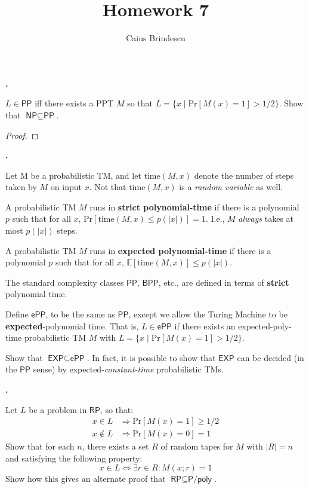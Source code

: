\documentclass[letterpaper,11pt]{article}
\title{Homework 7}
\author{Caius Brindescu}
\newcommand{\cc}[1]{\ensuremath{\textsf{#1}}\xspace}
\newcommand{\NP}{\cc{NP}}
\newcommand{\EXP}{\cc{EXP}}
\newcommand{\Ppoly}{\cc{P/poly}}
\newcommand{\BPP}{\cc{BPP}}
\newcommand{\RP}{\cc{RP}}
\newcommand{\PP}{\cc{PP}}
\newcommand{\ePP}{\cc{ePP}}
\newcommand{\Prob}{\mbox{Pr}}
\newcommand{\Time}[1]{\mbox{time}#1}
\newcounter{problem}
\newenvironment{problem}%
{%
	\stepcounter{problem}%
	\textbf{\theproblem.}
	\large
}{\\}%
\newcommand{\tm}{Turing Machine}
\begin{document}
\maketitle

\begin{problem}
$L \in \PP$ iff there exists a PPT $M$ so that $L = \{ x \mid \Prob[M(x) = 1] > 1/2\}$.
Show that $\NP \subseteq \PP$.
\end{problem}

\begin{proof}
\end{proof}

\begin{problem}
Let M be a probabilistic TM, and let $\Time(M,x)$ denote the number of steps taken by $M$ on input $x$.
Not that $\Time(M,x)$ is a {\it random variable} as well.

A probabilistic TM $M$ runs in {\bf strict polynomial-time} if there is a polynomial $p$ such that for all $x$, $\Prob[\Time(M,x) \leq p(|x|)] =1$. 
I.e., $M$ {\it always} takes at most $p(|x|)$ steps.

A probabilistic TM $M$ runs in {\bf expected polynomial-time} if there is a polynomial $p$ such that for all $x$, $\mathbb{E}[\Time(M,x)] \leq p(|x|)$.

The standard complexity classes $\PP$, $\BPP$, etc., are defined in terms of {\bf strict} polynomial time.

Define $\ePP$, to be the same as $\PP$, except we allow the \tm{} to be {\bf expected}-polynomial time.
That is, $L \in \ePP$ if there exists an expected-poly-time probabilistic TM $M$ with $L = \{ x \mid \Prob[M(x) = 1] > 1/2\}$.

Show that $\EXP \subseteq \ePP$.
In fact, it is possible to show that $\EXP$ can be decided (in the $\PP$ sense) by expected-{\it constant-time} probabilistic TMs.
\end{problem}

\begin{problem}
Let $L$ be a problem in $\RP$, so that:
\begin{align*}
	x \in L &\Rightarrow \Prob[M(x) = 1] \geq 1/2 \\
	x \not \in L &\Rightarrow \Prob[M(x) = 0] = 1
\end{align*}
Show that for each $n$, there exists a set $R$ of random tapes for $M$ with $|R| = n$ and satisfying the following property:
\[
	x \in L \Leftrightarrow \exists r \in R : M(x;r) = 1
\]
Show how this gives an alternate proof that $\RP \subseteq \Ppoly$.
\end{problem}
\end{document}

